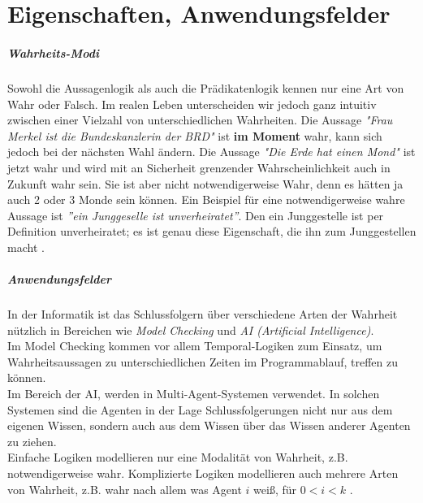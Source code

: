 
\chapter{Eigenschaften, Anwendungsfelder} %
\label{sec:eigenschaften_anwendungsfelder}

\paragraph{Wahrheits-Modi} %
\label{par:wahrheits_modi}

Sowohl die Aussagenlogik als auch die Prädikatenlogik kennen nur eine Art von Wahr oder Falsch. 
Im realen Leben unterscheiden wir jedoch ganz intuitiv zwischen einer Vielzahl von unterschiedlichen Wahrheiten.
Die Aussage \emph{"Frau Merkel ist die Bundeskanzlerin der BRD"} ist \textbf{im Moment} wahr, kann sich jedoch bei der nächsten Wahl ändern.
Die Aussage \emph{"Die Erde hat einen Mond"} ist jetzt wahr und wird mit an Sicherheit grenzender Wahrscheinlichkeit auch in Zukunft wahr sein. 
Sie ist aber nicht notwendigerweise Wahr, denn es hätten ja auch 2 oder 3 Monde sein können.
Ein Beispiel für eine notwendigerweise wahre Aussage ist \emph{''ein Junggeselle ist unverheiratet''}. 
Den ein Junggestelle ist per Definition unverheiratet; es ist genau diese Eigenschaft, die ihn zum Junggestellen macht .


\paragraph{Anwendungsfelder} %
\label{par:anwendungsfelder}

In der Informatik ist das Schlussfolgern über verschiedene Arten der Wahrheit nützlich in Bereichen wie \emph{Model Checking} und \emph{AI (Artificial Intelligence)}. \\
Im Model Checking kommen vor allem Temporal-Logiken zum Einsatz, um Wahrheitsaussagen zu unterschiedlichen Zeiten im Programmablauf, treffen zu können. \\
Im Bereich der AI, werden \MMLn in Multi-Agent-Systemen verwendet. 
In solchen Systemen sind die Agenten in der Lage Schlussfolgerungen nicht nur aus dem eigenen Wissen, sondern auch aus dem Wissen über das Wissen anderer Agenten zu ziehen.\\
Einfache Logiken modellieren nur eine Modalität von Wahrheit, z.B. notwendigerweise wahr. Komplizierte Logiken modellieren auch mehrere Arten von Wahrheit, z.B. wahr nach allem was Agent $i$ weiß, für $ 0 < i < k$ .\\

